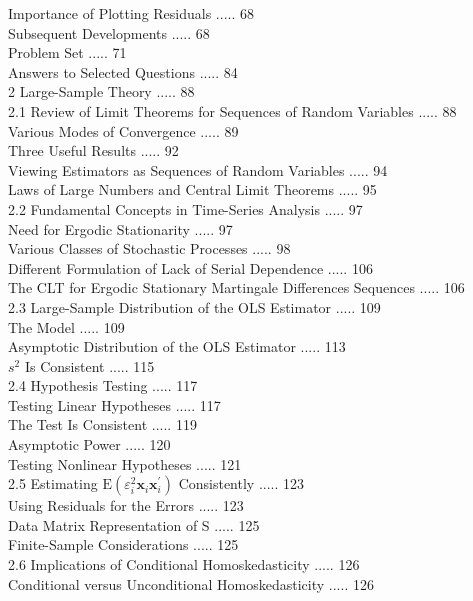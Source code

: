 \documentclass[10pt]{article}
\begin{document}
Importance of Plotting Residuals ..... 68\\
Subsequent Developments ..... 68\\
Problem Set ..... 71\\
Answers to Selected Questions ..... 84\\
2 Large-Sample Theory ..... 88\\
2.1 Review of Limit Theorems for Sequences of Random Variables ..... 88\\
Various Modes of Convergence ..... 89\\
Three Useful Results ..... 92\\
Viewing Estimators as Sequences of Random Variables ..... 94\\
Laws of Large Numbers and Central Limit Theorems ..... 95\\
2.2 Fundamental Concepts in Time-Series Analysis ..... 97\\
Need for Ergodic Stationarity ..... 97\\
Various Classes of Stochastic Processes ..... 98\\
Different Formulation of Lack of Serial Dependence ..... 106\\
The CLT for Ergodic Stationary Martingale Differences Sequences ..... 106\\
2.3 Large-Sample Distribution of the OLS Estimator ..... 109\\
The Model ..... 109\\
Asymptotic Distribution of the OLS Estimator ..... 113\\
$s^{2}$ Is Consistent ..... 115\\
2.4 Hypothesis Testing ..... 117\\
Testing Linear Hypotheses ..... 117\\
The Test Is Consistent ..... 119\\
Asymptotic Power ..... 120\\
Testing Nonlinear Hypotheses ..... 121\\
2.5 Estimating $\mathrm{E}\left(\varepsilon_{i}^{2} \mathbf{x}_{i} \mathbf{x}_{i}^{\prime}\right)$ Consistently ..... 123\\
Using Residuals for the Errors ..... 123\\
Data Matrix Representation of S ..... 125\\
Finite-Sample Considerations ..... 125\\
2.6 Implications of Conditional Homoskedasticity ..... 126\\
Conditional versus Unconditional Homoskedasticity ..... 126\\
\end{document}
